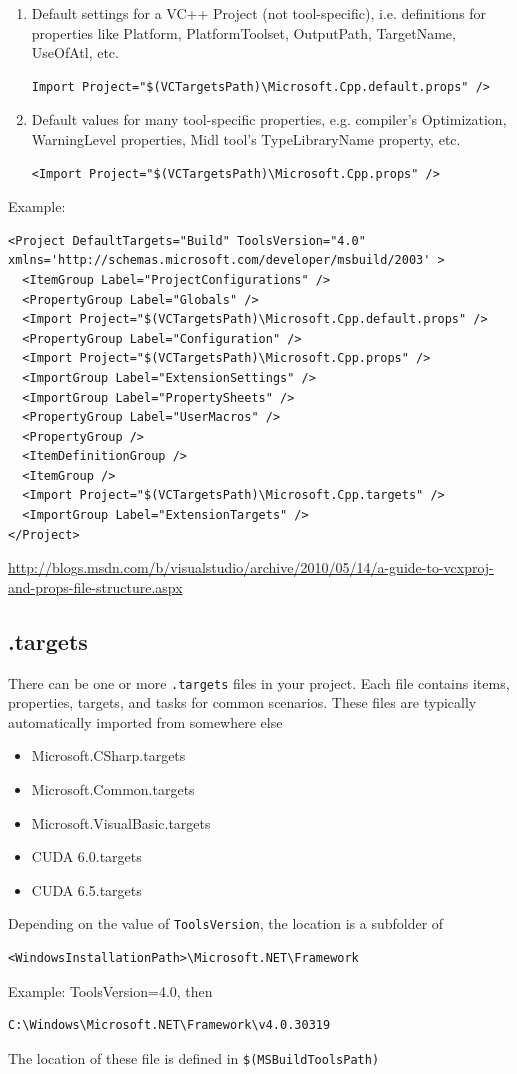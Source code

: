 \begin{enumerate}
  \item Default settings for a VC++ Project (not tool-specific), i.e.
  definitions for properties like Platform, PlatformToolset, OutputPath, TargetName, UseOfAtl,
  etc.
\begin{verbatim}
Import Project="$(VCTargetsPath)\Microsoft.Cpp.default.props" />
\end{verbatim}  

  \item Default values for many tool-specific properties, e.g. compiler's
  Optimization, WarningLevel properties, Midl tool's TypeLibraryName property,
  etc.
\begin{verbatim}
<Import Project="$(VCTargetsPath)\Microsoft.Cpp.props" />
\end{verbatim}
\end{enumerate}


Example:
\begin{verbatim}
<Project DefaultTargets="Build" ToolsVersion="4.0" xmlns='http://schemas.microsoft.com/developer/msbuild/2003' >
  <ItemGroup Label="ProjectConfigurations" />
  <PropertyGroup Label="Globals" />
  <Import Project="$(VCTargetsPath)\Microsoft.Cpp.default.props" />
  <PropertyGroup Label="Configuration" />
  <Import Project="$(VCTargetsPath)\Microsoft.Cpp.props" />
  <ImportGroup Label="ExtensionSettings" />
  <ImportGroup Label="PropertySheets" />
  <PropertyGroup Label="UserMacros" />
  <PropertyGroup />
  <ItemDefinitionGroup />
  <ItemGroup />
  <Import Project="$(VCTargetsPath)\Microsoft.Cpp.targets" />
  <ImportGroup Label="ExtensionTargets" />
</Project>
\end{verbatim}

\url{http://blogs.msdn.com/b/visualstudio/archive/2010/05/14/a-guide-to-vcxproj-and-props-file-structure.aspx}

\subsection{.targets}

There can be one or more \verb!.targets! files in your project. Each file
contains items, properties, targets, and tasks for common scenarios. These files
are typically automatically imported from somewhere else
\begin{itemize}
  \item Microsoft.CSharp.targets
  \item Microsoft.Common.targets
  \item Microsoft.VisualBasic.targets
  \item CUDA 6.0.targets
  \item CUDA 6.5.targets
\end{itemize}
Depending on the value of \verb!ToolsVersion!, the location is a subfolder of
\begin{verbatim}
<WindowsInstallationPath>\Microsoft.NET\Framework
\end{verbatim}
Example: ToolsVersion=4.0, then 
\begin{verbatim}
C:\Windows\Microsoft.NET\Framework\v4.0.30319
\end{verbatim}
The location of these file is defined in \verb!$(MSBuildToolsPath)!

